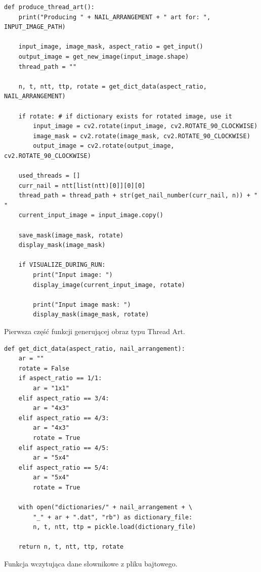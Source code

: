         \begin{code}[H]
        \begin{verbatim}
def produce_thread_art():
    print("Producing " + NAIL_ARRANGEMENT + " art for: ", INPUT_IMAGE_PATH)
    
    input_image, image_mask, aspect_ratio = get_input()
    output_image = get_new_image(input_image.shape)
    thread_path = ""

    n, t, ntt, ttp, rotate = get_dict_data(aspect_ratio, NAIL_ARRANGEMENT)

    if rotate: # if dictionary exists for rotated image, use it
        input_image = cv2.rotate(input_image, cv2.ROTATE_90_CLOCKWISE)
        image_mask = cv2.rotate(image_mask, cv2.ROTATE_90_CLOCKWISE)
        output_image = cv2.rotate(output_image, cv2.ROTATE_90_CLOCKWISE)

    used_threads = []
    curr_nail = ntt[list(ntt)[0]][0][0]
    thread_path = thread_path + str(get_nail_number(curr_nail, n)) + " "
    current_input_image = input_image.copy()

    save_mask(image_mask, rotate)
    display_mask(image_mask)
    
    if VISUALIZE_DURING_RUN:
        print("Input image: ")
        display_image(current_input_image, rotate)
        
        print("Input image mask: ")
        display_mask(image_mask, rotate)
        \end{verbatim}
        \caption{Pierwsza część funkcji generującej obraz typu Thread Art.}
        \label{imp-art-algorithm-prep-code}
        \end{code}
        
        \begin{code}[H]
        \begin{verbatim}
def get_dict_data(aspect_ratio, nail_arrangement):
    ar = ""
    rotate = False
    if aspect_ratio == 1/1: 
        ar = "1x1"
    elif aspect_ratio == 3/4: 
        ar = "4x3"
    elif aspect_ratio == 4/3: 
        ar = "4x3"
        rotate = True
    elif aspect_ratio == 4/5: 
        ar = "5x4"
    elif aspect_ratio == 5/4: 
        ar = "5x4"
        rotate = True

    with open("dictionaries/" + nail_arrangement + \
        "_" + ar + ".dat", "rb") as dictionary_file:
        n, t, ntt, ttp = pickle.load(dictionary_file)

    return n, t, ntt, ttp, rotate
        \end{verbatim}
        \caption{Funkcja wczytująca dane słownikowe z pliku bajtowego.}
        \label{imp-art-read-dict-code}
        \end{code}
        
